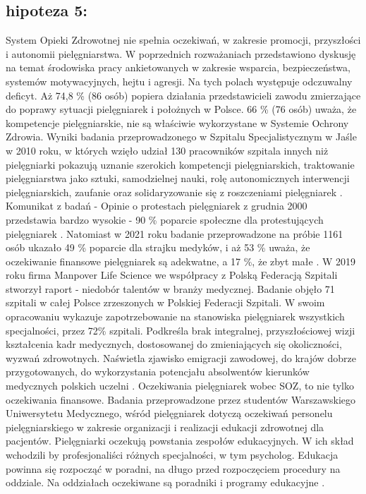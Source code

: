 \documentclass[a4paper,12pt,twoside,openany]{report}
\begin{document}
\subsection{hipoteza 5:} 
System Opieki Zdrowotnej nie spełnia oczekiwań, w zakresie promocji, przyszłości i autonomii pielęgniarstwa. W poprzednich rozważaniach przedstawiono dyskusję  na temat środowiska pracy ankietowanych w zakresie wsparcia, bezpieczeństwa, systemów motywacyjnych, hejtu  i agresji. Na tych polach występuje odczuwalny deficyt. Aż 74,8 \%  (86 osób) popiera działania przedstawicieli zawodu zmierzające do poprawy sytuacji pielęgniarek i położnych w Polsce.  66 \% (76 osób) uważa, że kompetencje pielęgniarskie, nie są właściwie wykorzystane w Systemie Ochrony Zdrowia. Wyniki badania przeprowadzonego w Szpitalu Specjalistycznym w Jaśle w 2010 roku, w których wzięło udział 130 pracowników szpitala innych niż pielęgniarki pokazują uznanie szerokich kompetencji pielęgniarskich, traktowanie pielęgniarstwa jako sztuki, samodzielnej nauki, rolę autonomicznych interwencji pielęgniarskich, zaufanie oraz solidaryzowanie się z roszczeniami pielęgniarek \cite{skorupska}. Komunikat z badań - Opinie o protestach pielęgniarek z grudnia 2000 przedstawia bardzo wysokie - 90  \%  poparcie  społeczne dla protestujących pielęgniarek \cite{cebos}. Natomiast w 2021 roku badanie przeprowadzone na próbie 1161 osób ukazało 49 \% poparcie dla strajku medyków, i aż 53 \% uważa, że oczekiwanie finansowe pielęgniarek są adekwatne, a 17 \%, że zbyt małe \cite{cebos2}. W 2019 roku firma Manpover Life Science we współpracy z Polską Federacją Szpitali stworzył raport - niedobór talentów w branży medycznej. Badanie objęło 71 szpitali w całej Polsce zrzeszonych w Polskiej Federacji Szpitali. W swoim opracowaniu wykazuje zapotrzebowanie na stanowiska pielęgniarek wszystkich specjalności, przez 72\% szpitali. Podkreśla brak integralnej, przyszłościowej wizji kształcenia kadr medycznych, dostosowanej do zmieniających się okoliczności, wyzwań zdrowotnych. Naświetla zjawisko emigracji zawodowej,  do krajów dobrze przygotowanych, do wykorzystania potencjału absolwentów kierunków medycznych polskich uczelni \cite{federacja}.
Oczekiwania pielęgniarek wobec SOZ, to nie tylko oczekiwania finansowe. Badania przeprowadzone przez studentów Warszawskiego Uniwersytetu Medycznego, wśród pielęgniarek dotyczą oczekiwań personelu pielęgniarskiego w zakresie organizacji i realizacji edukacji zdrowotnej dla pacjentów. Pielęgniarki oczekują powstania zespołów edukacyjnych. W ich skład wchodzili by profesjonaliści różnych specjalności, w tym psycholog. Edukacja powinna się rozpocząć w poradni, na długo przed rozpoczęciem procedury na oddziale. Na oddziałach oczekiwane są poradniki i programy edukacyjne \cite{soz}.
\end{document}
